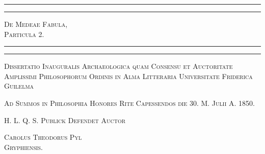 \documentclass[a4paper, 11pt, oneside, polutonikogreek, german]{article}
\begin{document}
\begin{titlepage} %
	\centering %

	
	\rule{\textwidth}{1.6pt}\vspace*{-\baselineskip}\vspace*{2pt} %
	\rule{\textwidth}{0.4pt} %
	
	\vspace{1\baselineskip} %
	
	{\scshape\Huge De Medeae Fabula,\\ \Large Particula 2.}
	
	\vspace{1\baselineskip} %

	\rule{\textwidth}{0.4pt}\vspace*{-\baselineskip}\vspace{3.2pt} %
	\rule{\textwidth}{1.6pt} %
	
	\vspace{1\baselineskip} %
	
	
	{\scshape \large Dissertatio Inauguralis Archaeologica quam Consensu et Auctoritate Amplissimi Philosophorum Ordinis in Alma Litteraria Universitate Friderica Guilelma}
 
        \vspace{0.5\baselineskip}
        
        {\scshape \small Ad Summos in Philosophia Honores Rite Capessendos die 30. M. Julii A. 1850.}

        \vspace{0.5\baselineskip}
        
        {\scshape \scriptsize H. L. Q. S. Publick Defendet Auctor} %
	
	\vspace*{1\baselineskip} %
	
        {\scshape \Large Carolus Theodorus Pyl\\\normalsize Gryphiensis.} %


\end{titlepage}
\end{document}
